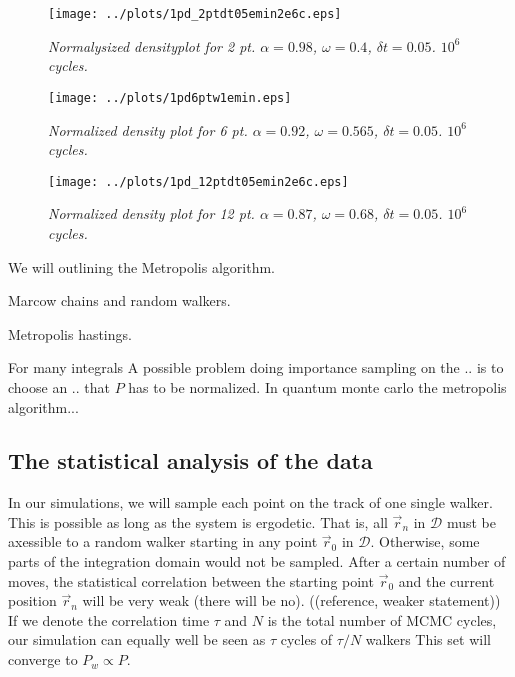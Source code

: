 \documentclass[a4paper,10pt,twocolumn]{article} %
\begin{document}
\begin{figure}[h]
\begin{center}
	\texttt{[image: ../plots/1pd\_2ptdt05emin2e6c.eps]}
\end{center}
\caption{{\it\small Normalysized densityplot for 2 pt. $\alpha=0.98$, $\omega=0.4$, $\delta t=0.05$. $10^6$ cycles. }}

\begin{center}
	\texttt{[image: ../plots/1pd6ptw1emin.eps]}
\end{center}
\caption{{\it\small Normalized density plot for 6 pt. $\alpha=0.92$, $\omega=0.565$, $\delta t=0.05$. $10^6$ cycles. }}

\begin{center}
	\texttt{[image: ../plots/1pd\_12ptdt05emin2e6c.eps]}
\end{center}
\caption{{\it\small Normalized density plot for 12 pt. $\alpha=0.87$, $\omega=0.68$, $\delta t=0.05$. $10^6$ cycles. }}
\end{figure}
We will outlining the Metropolis algorithm.

Marcow chains and random walkers.

Metropolis hastings.


For many integrals
A possible problem doing importance sampling on the .. is to choose an .. that $P$ has to be normalized. In quantum monte carlo
the metropolis algorithm...

\subsection{The statistical analysis of the data}%

In our simulations, we will sample each point on the track of one single walker. 
This is possible as long as the system is ergodetic. That is, all $\vec r_n$ in $\mathcal D$ must be axessible to a 
random walker starting in any point $\vec r_0$ in $\mathcal D$. 
Otherwise, some parts of the integration domain would not be sampled.
After a certain number of moves, the statistical correlation between
the starting point $\vec r_0$ and the current position $\vec r_n$ will be very weak (there will be no). 
((reference, weaker statement))
If we denote the correlation time $\tau$ and $N$ is the total number of MCMC cycles, 
our simulation can equally well be seen as $\tau$ cycles of $\tau/N$ walkers
This set will converge to $P_w \propto P$.
\end{document}
